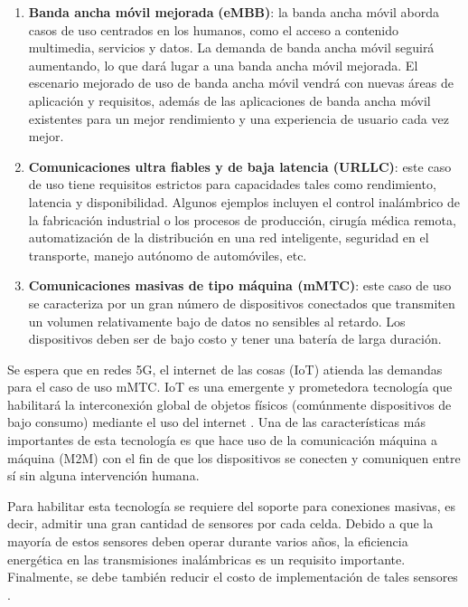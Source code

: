 \begin{enumerate}
    \item \textbf{Banda ancha móvil mejorada} \textbf{(eMBB)}: la banda ancha móvil aborda casos de uso centrados en los humanos, como el acceso a contenido multimedia, servicios y datos. La demanda de banda ancha móvil seguirá aumentando, lo que dará lugar a una banda ancha móvil mejorada. El escenario mejorado de uso de banda ancha móvil vendrá con nuevas áreas de aplicación y requisitos, además de las aplicaciones de banda ancha móvil existentes para un mejor rendimiento y una experiencia de usuario cada vez mejor.
    \item \textbf{Comunicaciones ultra fiables y de baja latencia (URLLC)}: este caso de uso tiene requisitos estrictos para capacidades tales como rendimiento, latencia y disponibilidad. Algunos ejemplos incluyen el control inalámbrico de la fabricación industrial o los procesos de producción, cirugía médica remota, automatización de la distribución en una red inteligente, seguridad en el transporte, manejo autónomo de automóviles, etc.
    \item \textbf{Comunicaciones masivas de tipo máquina (mMTC)}: este caso de uso se caracteriza por un gran número de dispositivos conectados que transmiten un volumen relativamente bajo de datos no sensibles al retardo. Los dispositivos deben ser de bajo costo y tener una batería de larga duración.
\end{enumerate}

Se espera que en redes 5G, el internet de las cosas (IoT) atienda las demandas para el caso de uso mMTC. IoT es una emergente y prometedora tecnología que habilitará la interconexión global de objetos físicos (comúnmente dispositivos de bajo consumo) mediante el uso del internet \parencite{5GSurveyAkpaku}. Una de las características más importantes de esta tecnología es que hace uso de la comunicación máquina a máquina (M2M) con el fin de que los dispositivos se conecten y comuniquen entre sí sin alguna intervención humana.\newline

Para habilitar esta tecnología se requiere del soporte para conexiones masivas, es decir, admitir una gran cantidad de sensores por cada celda. Debido a que la mayoría de estos sensores deben operar durante varios años, la eficiencia energética en las transmisiones inalámbricas es un requisito importante. Finalmente, se debe también reducir el costo de implementación de tales sensores \parencite{IoT5GWire}.

